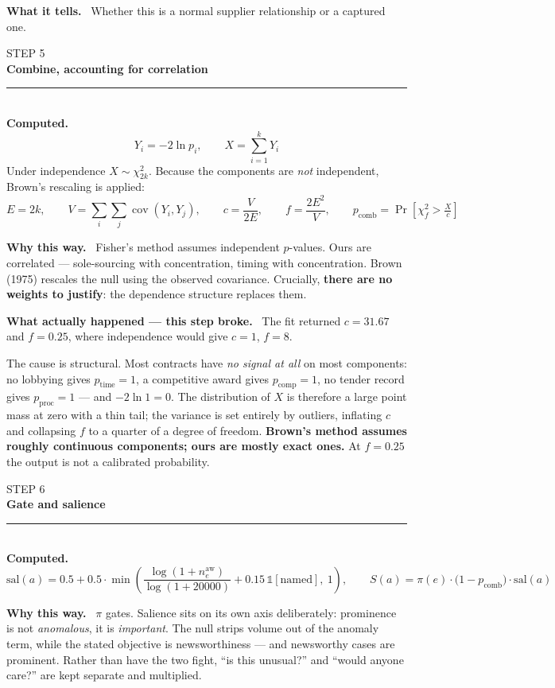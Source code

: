 \documentclass[11pt,a4paper]{article}
\newcommand{\stephead}[2]{%
  \vspace{1.1em}\noindent
  {\color{slate}\ttfamily\footnotesize STEP #1}\\[-0.15em]
  {\large\bfseries\color{pine} #2}\\[0.25em]
  {\color{rulec}\rule{\linewidth}{0.6pt}}\\[0.3em]}
\newcommand{\field}[1]{\smallskip\noindent\textbf{#1}\ }
\begin{document}
\field{What it tells.} Whether this is a normal supplier relationship or a captured one.

\stephead{5}{Combine, accounting for correlation}

\field{Computed.}
\[
Y_i = -2\ln p_i, \qquad X = \sum_{i=1}^{k} Y_i
\]
Under independence $X \sim \chi^2_{2k}$. Because the components are \emph{not}
independent, Brown's rescaling is applied:
\[
E = 2k, \qquad
V = \sum_{i}\sum_{j}\operatorname{cov}(Y_i, Y_j), \qquad
c = \frac{V}{2E}, \qquad
f = \frac{2E^2}{V},
\qquad
p_{\mathrm{comb}} = \Pr\!\left[\chi^2_f > \tfrac{X}{c}\right]
\]

\field{Why this way.}
Fisher's method assumes independent $p$-values. Ours are correlated --- sole-sourcing
with concentration, timing with concentration. Brown (1975) rescales the null using the
observed covariance. Crucially, \textbf{there are no weights to justify}: the dependence
structure replaces them.

\field{\textcolor{mulberry}{What actually happened --- this step broke.}}
The fit returned $c = 31.67$ and $f = 0.25$, where independence would give $c = 1$,
$f = 8$.

The cause is structural. Most contracts have \emph{no signal at all} on most components:
no lobbying gives $p_{\mathrm{time}} = 1$, a competitive award gives
$p_{\mathrm{comp}} = 1$, no tender record gives $p_{\mathrm{proc}} = 1$ --- and
$-2\ln 1 = 0$. The distribution of $X$ is therefore a large point mass at zero with a
thin tail; the variance is set entirely by outliers, inflating $c$ and collapsing $f$ to
a quarter of a degree of freedom. \textbf{Brown's method assumes roughly continuous
components; ours are mostly exact ones.} At $f = 0.25$ the output is not a calibrated
probability.

\stephead{6}{Gate and salience}

\field{Computed.}
\[
\mathrm{sal}(a) = 0.5 + 0.5\cdot\min\!\left(\frac{\log(1+n^{\mathrm{aw}}_e)}{\log(1+20000)} + 0.15\,\mathbb{1}[\text{named}],\ 1\right),
\qquad
S(a) = \pi(e)\cdot\bigl(1-p_{\mathrm{comb}}\bigr)\cdot \mathrm{sal}(a)
\]

\field{Why this way.}
$\pi$ gates. Salience sits on its own axis deliberately: prominence is not
\emph{anomalous}, it is \emph{important}. The null strips volume out of the anomaly term,
while the stated objective is newsworthiness --- and newsworthy cases are prominent. Rather
than have the two fight, ``is this unusual?'' and ``would anyone care?'' are kept separate
and multiplied.
\end{document}
